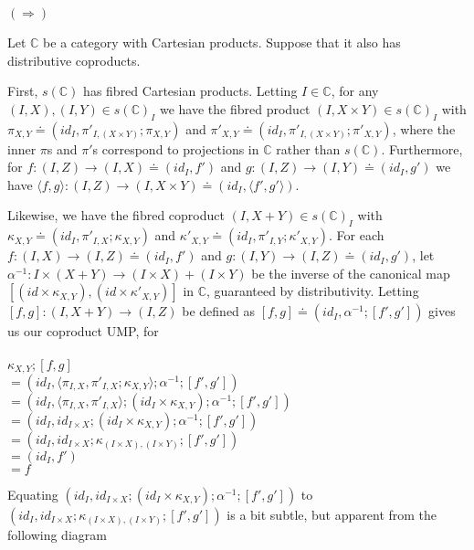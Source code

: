 \documentclass{article}
\begin{document}
$(\Rightarrow)$

Let $\mathbb C$ be a category with Cartesian products. Suppose that it also has distributive coproducts.

First, $s(\mathbb C)$ has fibred Cartesian products. Letting $I \in \mathbb C$, for any $(I,X),(I,Y) \in s(\mathbb C)_I$
we have the fibred product $(I, X \times Y) \in s(\mathbb C)_I$ with $\pi_{X,Y} \doteq (id_I, \pi'_{I,(X \times Y)};\pi_{X,Y})$ and $\pi'_{X,Y} \doteq (id_I, \pi'_{I,(X \times Y)};\pi'_{X,Y})$, where the inner $\pi$s and $\pi'$s correspond to projections in $\mathbb C$ rather than $s(\mathbb C)$.
Furthermore, for $f : (I,Z) \to (I,X) \doteq (id_I, f')$ and $g : (I,Z) \to (I,Y) \doteq (id_I,g')$ we have
$\langle f, g \rangle : (I,Z) \to (I, X \times Y) \doteq (id_I, \langle f',g'\rangle)$.
 
Likewise, we have the fibred coproduct $(I, X + Y) \in s(\mathbb C)_I$ with 
$\kappa_{X,Y} \doteq (id_I, \pi'_{I,X};\kappa_{X,Y})$ and $\kappa'_{X,Y} \doteq (id_I, \pi'_{I,Y};\kappa'_{X,Y})$.
For each $f : (I, X) \to (I,Z) \doteq (id_I, f')$ and $g : (I,Y) \to (I,Z) \doteq (id_I, g')$,
let $\alpha^{-1} : I \times (X + Y) \to (I \times X) + (I \times Y)$ be the inverse of the canonical map
$[(id \times \kappa_{X,Y}),(id \times \kappa'_{X,Y})]$ in $\mathbb C$,
guaranteed by distributivity.
Letting $[f,g] : (I, X + Y) \to (I , Z)$ be defined as $[f,g] \doteq (id_I, \alpha^{-1};[f', g'])$ gives us our
coproduct UMP, for \\~\\
$\kappa_{X,Y};[f,g]$\\ 
$= (id_I, \langle \pi_{I,X}, \pi'_{I,X};\kappa_{X,Y} \rangle;\alpha^{-1};[f',g'])$\\
$= (id_I, \langle \pi_{I,X}, \pi'_{I,X} \rangle;(id_I \times \kappa_{X,Y});\alpha^{-1};[f',g'])$\\
$= (id_I, id_{I \times X};(id_I \times \kappa_{X,Y});\alpha^{-1};[f',g'])$\\
$= (id_I, id_{I \times X};\kappa_{(I \times X),(I \times Y)};[f',g'])$\\
$= (id_I, f')$\\
$= f$

Equating $(id_I, id_{I \times X};(id_I \times \kappa_{X,Y});\alpha^{-1};[f',g'])$ to 
$(id_I, id_{I \times X};\kappa_{(I \times X),(I \times Y)};[f',g'])$ is a bit subtle, but apparent from the following diagram

\end{document}
